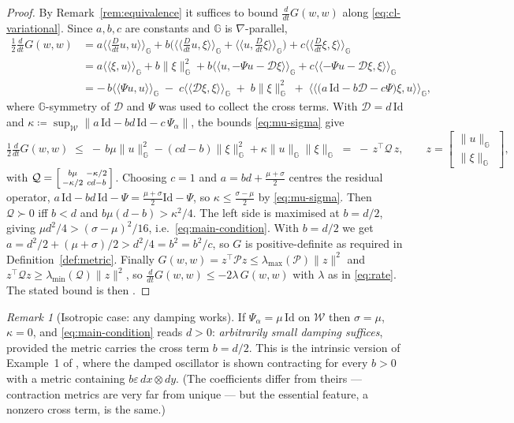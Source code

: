 \documentclass[11pt,a4paper]{article}
\newcommand{\Gm}{\mathbb{G}}                      %
\newcommand{\ipG}[2]{\langle\!\langle #1 , #2 \rangle\!\rangle_{\Gm}}
\newcommand{\Damp}{\mathcal{D}}
\newcommand{\Stiff}{\Psi}
\newcommand{\id}{\mathrm{Id}}
\newcommand{\norm}[1]{\lVert #1 \rVert}
\newcommand{\normG}[1]{\lVert #1 \rVert_{\Gm}}
\newcommand{\Dt}{\tfrac{D}{dt}}
\theoremstyle{plain}
\theoremstyle{definition}
\theoremstyle{remark}
\newtheorem{remark}[theorem]{Remark}
\begin{document}
\begin{proof}
By Remark~\ref{rem:equivalence} it suffices to bound
$\tfrac{d}{dt}G(w,w)$ along \eqref{eq:cl-variational}. Since $a,b,c$ are constants
and $\Gm$ is $\nabla$-parallel,
\begin{align*}
  \tfrac12\tfrac{d}{dt}G(w,w)
   &= a\ipG{\Dt u}{u} + b\big(\ipG{\Dt u}{\xi} + \ipG{u}{\Dt \xi}\big)
      + c\ipG{\Dt \xi}{\xi}\\
   &= a\ipG{\xi}{u} + b\normG{\xi}^2
      + b\ipG{u}{-\Stiff u - \Damp\xi}
      + c\ipG{-\Stiff u - \Damp\xi}{\xi}\\
   &= -\,b\ipG{\Stiff u}{u} \;-\; c\ipG{\Damp\xi}{\xi} \;+\; b\normG{\xi}^2
      \;+\; \ipG{\big(a\,\id - b\Damp - c\Stiff\big)\xi}{u},
\end{align*}
where $\Gm$-symmetry of $\Damp$ and $\Stiff$ was used to collect the cross terms.
With $\Damp = d\,\id$ and $\kappa \coloneqq
\sup_{\mathcal{W}}\norm{a\,\id - bd\,\id - c\,\Stiff_\alpha}$, the bounds
\eqref{eq:mu-sigma} give
\[
  \tfrac12\tfrac{d}{dt}G(w,w)
  \;\le\; -\,b\mu\normG{u}^2 - (cd-b)\normG{\xi}^2 + \kappa\normG{u}\normG{\xi}
  \;=\; -\,z^{\!\top}\mathcal{Q}\,z,
  \qquad z = \begin{bmatrix}\normG{u}\\ \normG{\xi}\end{bmatrix},
\]
with $\mathcal{Q} = \begin{bsmallmatrix} b\mu & -\kappa/2\\ -\kappa/2 & cd-b\end{bsmallmatrix}$.
Choosing $c=1$ and $a = bd + \tfrac{\mu+\sigma}{2}$ centres the residual operator,
$a\,\id - bd\,\id - \Stiff = \tfrac{\mu+\sigma}{2}\id - \Stiff$, so
$\kappa \le \tfrac{\sigma-\mu}{2}$ by \eqref{eq:mu-sigma}. Then
$\mathcal{Q}\succ0$ iff $b < d$ and $b\mu(d-b) > \kappa^2/4$. The left side is
maximised at $b = d/2$, giving $\mu d^2/4 > (\sigma-\mu)^2/16$, i.e.\
\eqref{eq:main-condition}. With $b=d/2$ we get
$a = d^2/2 + (\mu+\sigma)/2 > d^2/4 = b^2 = b^2/c$, so $G$ is positive-definite as
required in Definition~\ref{def:metric}. Finally
$G(w,w) = z^{\!\top}\mathcal{P}z \le \lambda_{\max}(\mathcal{P})\norm{z}^2$ and
$z^{\!\top}\mathcal{Q}z \ge \lambda_{\min}(\mathcal{Q})\norm{z}^2$, so
$\tfrac{d}{dt}G(w,w) \le -2\lambda\,G(w,w)$ with $\lambda$ as in \eqref{eq:rate}.
The stated bound is then \cite[Thm.~2.3]{SB13}.
\end{proof}

\begin{remark}[Isotropic case: any damping works]
\label{rem:isotropic}
If $\Stiff_\alpha = \mu\,\id$ on $\mathcal{W}$ then $\sigma = \mu$,
$\kappa = 0$, and \eqref{eq:main-condition} reads $d > 0$: \emph{arbitrarily small
damping suffices}, provided the metric carries the cross term $b = d/2$. This is
the intrinsic version of Example~1 of \cite{SB13}, where the damped oscillator is
shown contracting for every $b>0$ with a metric containing
$b\varepsilon\,dx\otimes dy$. (The coefficients differ from theirs --- contraction
metrics are very far from unique --- but the essential feature, a nonzero cross
term, is the same.)
\end{remark}
\end{document}
